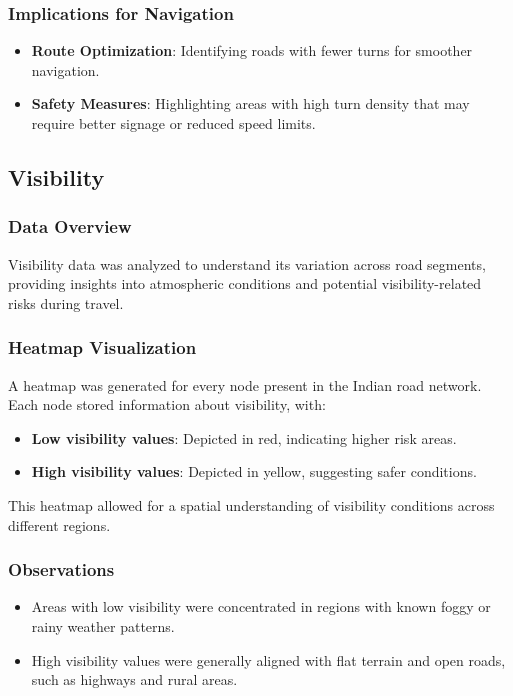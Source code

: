 \documentclass[sigplan,screen]{acmart}
\begin{document}
\subsubsection{Implications for Navigation}
\begin{itemize}
    \item \textbf{Route Optimization}: Identifying roads with fewer turns for smoother navigation.
    \item \textbf{Safety Measures}: Highlighting areas with high turn density that may require better signage or reduced speed limits.
\end{itemize}

\subsection{Visibility}
\subsubsection{Data Overview}
Visibility data was analyzed to understand its variation across road segments, providing insights into atmospheric conditions and potential visibility-related risks during travel.

\subsubsection{Heatmap Visualization}
A heatmap was generated for every node present in the Indian road network. Each node stored information about visibility, with:
\begin{itemize}
    \item \textbf{Low visibility values}: Depicted in red, indicating higher risk areas.
    \item \textbf{High visibility values}: Depicted in yellow, suggesting safer conditions.
\end{itemize}
This heatmap allowed for a spatial understanding of visibility conditions across different regions.

\subsubsection{Observations}
\begin{itemize}
    \item Areas with low visibility were concentrated in regions with known foggy or rainy weather patterns.
    \item High visibility values were generally aligned with flat terrain and open roads, such as highways and rural areas.
\end{itemize}
\end{document}
